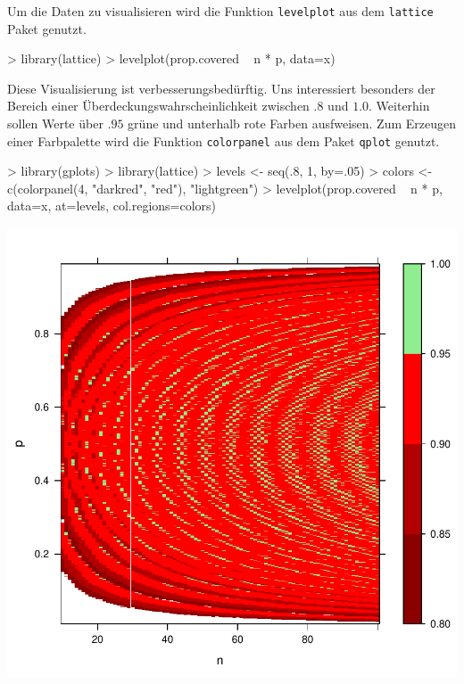     

Um die Daten zu visualisieren wird die Funktion \texttt{levelplot} aus dem \texttt{lattice} Paket genutzt.
  
\begin{Schunk}
\begin{Sinput}
> library(lattice)
> levelplot(prop.covered ~ n * p, data=x)
\end{Sinput}
\end{Schunk}

Diese Visualisierung ist verbesserungsbedürftig. Uns interessiert besonders der Bereich einer Überdeckungswahrscheinlichkeit zwischen $.8$ und $1.0$. Weiterhin sollen Werte über $.95$ grüne und unterhalb rote Farben ausfweisen. Zum Erzeugen einer Farbpalette wird die Funktion \texttt{colorpanel} aus dem Paket \texttt{qplot} genutzt. 

\begin{Schunk}
\begin{Sinput}
> library(gplots)
> library(lattice) 
> levels <- seq(.8, 1, by=.05)
> colors <- c(colorpanel(4, "darkred", "red"), "lightgreen")
> levelplot(prop.covered ~ n * p, data=x, 
            at=levels, col.regions=colors)            
\end{Sinput}
\end{Schunk}
\includegraphics{sim_binomial_prop-024}

